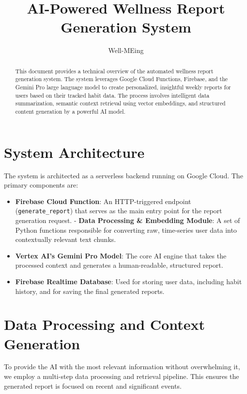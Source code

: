 \documentclass{article}
\title{\textbf{AI-Powered Wellness Report Generation System}}
\author{Well-MEing}
\date{}
\begin{document}
\maketitle

\begin{abstract}
This document provides a technical overview of the automated wellness report generation system. The system leverages Google Cloud Functions, Firebase, and the Gemini Pro large language model to create personalized, insightful weekly reports for users based on their tracked habit data. The process involves intelligent data summarization, semantic context retrieval using vector embeddings, and structured content generation by a powerful AI model.
\end{abstract}

\hrulefill

\section{System Architecture}
The system is architected as a serverless backend running on Google Cloud. The primary components are:
\begin{itemize}[noitemsep]
    \item \textbf{Firebase Cloud Function}: An HTTP-triggered endpoint (\texttt{generate\_report}) that serves as the main entry point for the report generation request.
    - \textbf{Data Processing \& Embedding Module}: A set of Python functions responsible for converting raw, time-series user data into contextually relevant text chunks.
    \item \textbf{Vertex AI's Gemini Pro Model}: The core AI engine that takes the processed context and generates a human-readable, structured report.
    \item \textbf{Firebase Realtime Database}: Used for storing user data, including habit history, and for saving the final generated reports.
\end{itemize}

\hrulefill

\section{Data Processing and Context Generation}
To provide the AI with the most relevant information without overwhelming it, we employ a multi-step data processing and retrieval pipeline. This ensures the generated report is focused on recent and significant events.
\end{document}
